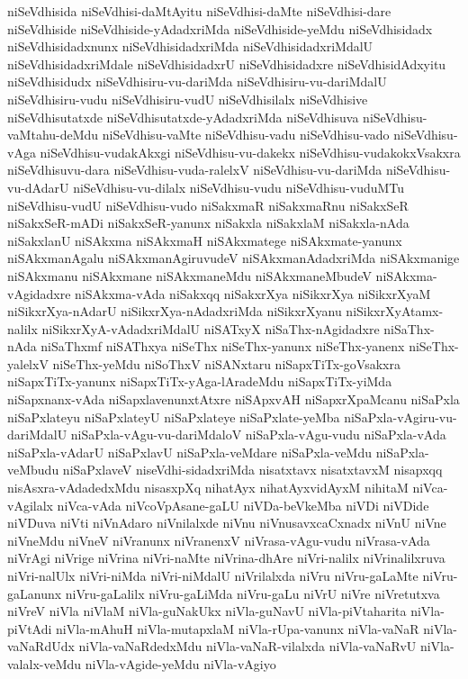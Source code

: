 {niSeVdhisida
niSeVdhisi-daMtAyitu
niSeVdhisi-daMte
niSeVdhisi-dare
niSeVdhiside
niSeVdhiside-yAdadxriMda
niSeVdhiside-yeMdu
niSeVdhisidadx
niSeVdhisidadxnunx
niSeVdhisidadxriMda
niSeVdhisidadxriMdalU
niSeVdhisidadxriMdale
niSeVdhisidadxrU
niSeVdhisidadxre
niSeVdhisidAdxyitu
niSeVdhisidudx
niSeVdhisiru-vu-dariMda
niSeVdhisiru-vu-dariMdalU
niSeVdhisiru-vudu
niSeVdhisiru-vudU
niSeVdhisilalx
niSeVdhisive
niSeVdhisutatxde
niSeVdhisutatxde-yAdadxriMda
niSeVdhisuva
niSeVdhisu-vaMtahu-deMdu
niSeVdhisu-vaMte
niSeVdhisu-vadu
niSeVdhisu-vado
niSeVdhisu-vAga
niSeVdhisu-vudakAkxgi
niSeVdhisu-vu-dakekx
niSeVdhisu-vudakokxVsakxra
niSeVdhisuvu-dara
niSeVdhisu-vuda-ralelxV
niSeVdhisu-vu-dariMda
niSeVdhisu-vu-dAdarU
niSeVdhisu-vu-dilalx
niSeVdhisu-vudu
niSeVdhisu-vuduMTu
niSeVdhisu-vudU
niSeVdhisu-vudo
niSakxmaR
niSakxmaRnu
niSakxSeR
niSakxSeR-mADi
niSakxSeR-yanunx
niSakxla
niSakxlaM
niSakxla-nAda
niSakxlanU
niSAkxma
niSAkxmaH
niSAkxmatege
niSAkxmate-yanunx
niSAkxmanAgalu
niSAkxmanAgiruvudeV
niSAkxmanAdadxriMda
niSAkxmanige
niSAkxmanu
niSAkxmane
niSAkxmaneMdu
niSAkxmaneMbudeV
niSAkxma-vAgidadxre
niSAkxma-vAda
niSakxqq
niSakxrXya
niSikxrXya
niSikxrXyaM
niSikxrXya-nAdarU
niSikxrXya-nAdadxriMda
niSikxrXyanu
niSikxrXyAtamx-nalilx
niSikxrXyA-vAdadxriMdalU
niSATxyX
niSaThx-nAgidadxre
niSaThx-nAda
niSaThxmf
niSAThxya
niSeThx
niSeThx-yanunx
niSeThx-yanenx
niSeThx-yalelxV
niSeThx-yeMdu
niSoThxV
niSANxtaru
niSapxTiTx-goVsakxra
niSapxTiTx-yanunx
niSapxTiTx-yAga-lAradeMdu
niSapxTiTx-yiMda
niSapxnanx-vAda
niSapxlavenunxtAtxre
niSApxvAH
niSapxrXpaMcanu
niSaPxla
niSaPxlateyu
niSaPxlateyU
niSaPxlateye
niSaPxlate-yeMba
niSaPxla-vAgiru-vu-dariMdalU
niSaPxla-vAgu-vu-dariMdaloV
niSaPxla-vAgu-vudu
niSaPxla-vAda
niSaPxla-vAdarU
niSaPxlavU
niSaPxla-veMdare
niSaPxla-veMdu
niSaPxla-veMbudu
niSaPxlaveV
niseVdhi-sidadxriMda
nisatxtavx
nisatxtavxM
nisapxqq
nisAsxra-vAdadedxMdu
nisasxpXq
nihatAyx
nihatAyxvidAyxM
nihitaM
niVca-vAgilalx
niVca-vAda
niVcoVpAsane-gaLU
niVDa-beVkeMba
niVDi
niVDide
niVDuva
niVti
niVnAdaro
niVnilalxde
niVnu
niVnusavxcaCxnadx
niVnU
niVne
niVneMdu
niVneV
niVranunx
niVranenxV
niVrasa-vAgu-vudu
niVrasa-vAda
niVrAgi
niVrige
niVrina
niVri-naMte
niVrina-dhAre
niVri-nalilx
niVrinalilxruva
niVri-nalUlx
niVri-niMda
niVri-niMdalU
niVrilalxda
niVru
niVru-gaLaMte
niVru-gaLanunx
niVru-gaLalilx
niVru-gaLiMda
niVru-gaLu
niVrU
niVre
niVretutxva
niVreV
niVla
niVlaM
niVla-guNakUkx
niVla-guNavU
niVla-piVtaharita
niVla-piVtAdi
niVla-mAhuH
niVla-mutapxlaM
niVla-rUpa-vanunx
niVla-vaNaR
niVla-vaNaRdUdx
niVla-vaNaRdedxMdu
niVla-vaNaR-vilalxda
niVla-vaNaRvU
niVla-valalx-veMdu
niVla-vAgide-yeMdu
niVla-vAgiyo
}

